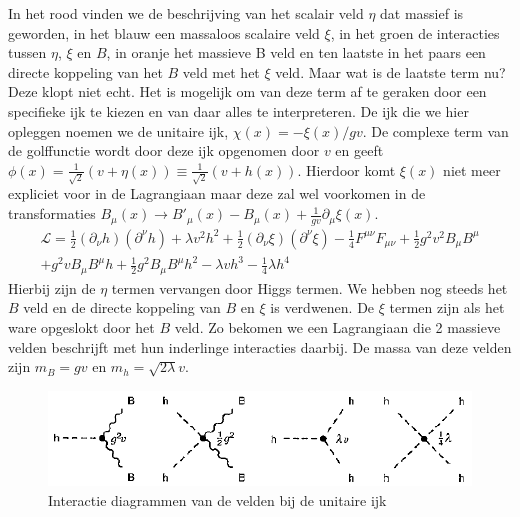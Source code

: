 \documentclass[../main.tex]{subfiles}
\begin{document}
In het rood vinden we de beschrijving van het scalair veld $\eta$ dat massief is geworden, in het blauw een massaloos scalaire veld $\xi$, in het groen de interacties tussen $\eta$, $\xi$ en $B$, in oranje het massieve B veld en ten laatste in het paars een directe koppeling van het $B$ veld met het $\xi$ veld. Maar wat is de laatste term nu? Deze klopt niet echt. Het is mogelijk om van deze term af te geraken door een specifieke ijk te kiezen en van daar alles te interpreteren. De ijk die we hier opleggen noemen we de unitaire ijk, $\chi(x) = -\xi(x)/gv$. De complexe term van de golffunctie wordt door deze ijk opgenomen door $v$ en geeft $\phi(x) = \frac{1}{\sqrt{2}} (v+\eta(x)) \equiv \frac{1}{\sqrt{2}} (v+h(x))$. Hierdoor komt $\xi(x)$ niet meer expliciet voor in de Lagrangiaan maar deze zal wel voorkomen in de transformaties $B_\mu (x) \rightarrow B'_\mu(x) - B_\mu(x) + \frac{1}{gv} \partial_\mu \xi(x)$.
\begin{equation}
    \begin{aligned}
        \label{eq:comp_scal_veld_lagr_unitaire_ijk}
        \mathcal{L} = \frac{1}{2} (\partial_\nu h)(\partial^\nu h) + \lambda v^2 h^2 + \frac{1}{2} (\partial_\nu\xi)(\partial^\nu\xi) - \frac{1}{4} F^{\mu\nu}F_{\mu\nu} + \frac{1}{2} g^2v^2B_\mu B^\mu\\
        + g^2vB_\mu B^\mu h + \frac{1}{2} g^2 B_\mu B^\mu h^2 - \lambda vh^3 - \frac{1}{4} \lambda h^4
    \end{aligned}
\end{equation}
Hierbij zijn de $\eta$ termen vervangen door Higgs termen. We hebben nog steeds het $B$ veld en de directe koppeling van $B$ en $\xi$ is verdwenen. De $\xi$ termen zijn als het ware opgeslokt door het $B$ veld. Zo bekomen we een Lagrangiaan die 2 massieve velden beschrijft met hun inderlinge interacties daarbij. De massa van deze velden zijn $m_B = gv$ en $m_h = \sqrt{2\lambda}v$.

\begin{figure}[h]
    \centering
    \includegraphics[width=0.8\linewidth]{higgs_boson/complex_scal_int_unitaire_ijk.png}
    \caption{Interactie diagrammen van de velden bij de unitaire ijk}%
    \label{fig:higgs_boson/complex_scal_int_unitaire_ijk}
\end{figure}
\end{document}
